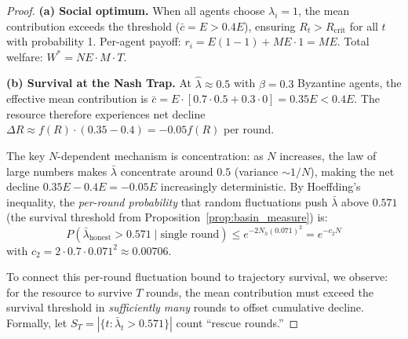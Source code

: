 \begin{proof}
\textbf{(a) Social optimum.}
When all agents choose $\lambda_i = 1$, the mean contribution
exceeds the threshold ($\bar{c} = E > 0.4E$), ensuring
$R_t > R_{\mathrm{crit}}$ for all $t$ with probability 1.
Per-agent payoff: $r_i = E(1-1) + ME \cdot 1 = ME$.
Total welfare: $W^* = NE \cdot M \cdot T$.

\textbf{(b) Survival at the Nash Trap.}
At $\hat{\lambda} \approx 0.5$ with $\beta = 0.3$ Byzantine agents,
the effective mean contribution is
$\bar{c} = E \cdot [0.7 \cdot 0.5 + 0.3 \cdot 0] = 0.35E < 0.4E$.
The resource therefore experiences net decline
$\Delta R \approx f(R) \cdot (0.35 - 0.4) = -0.05 f(R)$ per round.

The key $N$-dependent mechanism is concentration:
as $N$ increases, the law of large numbers makes
$\bar{\lambda}$ concentrate around $0.5$
(variance $\sim 1/N$), making the net decline
$0.35E - 0.4E = -0.05E$ increasingly deterministic.
By Hoeffding's inequality, the \emph{per-round probability} that
random fluctuations push $\bar{\lambda}$ above $0.571$
(the survival threshold from Proposition~\ref{prop:basin_measure}) is:
\[
  P(\bar{\lambda}_{\mathrm{honest}} > 0.571 \mid \text{single round})
  \leq e^{-2 N_h (0.071)^2}
  = e^{-c_2 N}
\]
with $c_2 = 2 \cdot 0.7 \cdot 0.071^2 \approx 0.00706$.

To connect this per-round fluctuation bound to trajectory survival, we observe: for the resource to survive $T$ rounds, the mean contribution must exceed the survival threshold in \emph{sufficiently many} rounds to offset cumulative decline. Formally, let $S_T = |\{t : \bar{\lambda}_t > 0.571\}|$ count ``rescue rounds.''


\end{proof}
